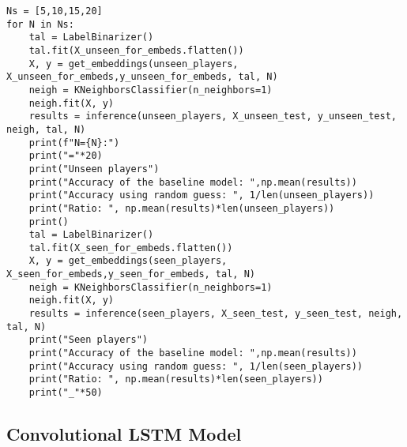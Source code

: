 \begin{verbatim}
Ns = [5,10,15,20]
for N in Ns:
    tal = LabelBinarizer()
    tal.fit(X_unseen_for_embeds.flatten())
    X, y = get_embeddings(unseen_players, X_unseen_for_embeds,y_unseen_for_embeds, tal, N)
    neigh = KNeighborsClassifier(n_neighbors=1)
    neigh.fit(X, y)
    results = inference(unseen_players, X_unseen_test, y_unseen_test, neigh, tal, N)
    print(f"N={N}:")
    print("="*20)
    print("Unseen players")
    print("Accuracy of the baseline model: ",np.mean(results))
    print("Accuracy using random guess: ", 1/len(unseen_players))
    print("Ratio: ", np.mean(results)*len(unseen_players))
    print()   
    tal = LabelBinarizer()
    tal.fit(X_seen_for_embeds.flatten())
    X, y = get_embeddings(seen_players, X_seen_for_embeds,y_seen_for_embeds, tal, N)
    neigh = KNeighborsClassifier(n_neighbors=1)
    neigh.fit(X, y)
    results = inference(seen_players, X_seen_test, y_seen_test, neigh, tal, N)
    print("Seen players")
    print("Accuracy of the baseline model: ",np.mean(results))
    print("Accuracy using random guess: ", 1/len(seen_players))
    print("Ratio: ", np.mean(results)*len(seen_players))
    print("_"*50)
\end{verbatim}

\subsection{Convolutional LSTM Model}

